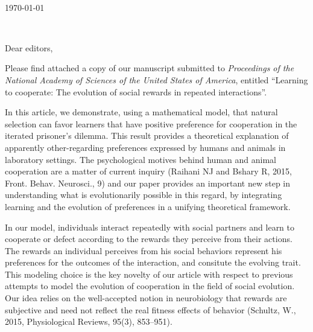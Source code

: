 \documentclass[11pt,letterpaper]{letter} %
\def\opening#1{\thispagestyle{empty}
{\centering\fromaddress \vspace{0.6in} \\ %
\hspace*{\longindentation}\today\hspace*{\fill}\par} %
{\raggedright \toname \\ \toaddress \par} %
\vspace{0.4in} %
\noindent #1 %
}
\begin{document}

\begin{letter}
{
}


\opening{Dear editors,}


Please find attached a copy of our manuscript submitted to \emph{Proceedings of the National Academy of Sciences of the United States of America}, entitled ``Learning to cooperate: The evolution of social rewards in repeated interactions''.


In this article, we demonstrate, using a mathematical model, that natural selection can favor learners that have positive preference for cooperation in the iterated prisoner's dilemma. This result provides a theoretical explanation of apparently other-regarding preferences expressed by humans and animals in laboratory settings. The psychological motives behind human and animal cooperation are a matter of current inquiry (Raihani NJ and Bshary R, 2015, Front. Behav. Neurosci., 9) and our paper provides an important new step in understanding what is evolutionarily possible in this regard, by integrating learning and the evolution of preferences in a unifying theoretical framework.

In our model, individuals interact repeatedly with social partners and learn to cooperate or defect according to the rewards they perceive from their actions. The rewards an individual perceives from his social behaviors represent his preferences for the outcomes of the interaction, and consitute the evolving trait. This modeling choice is the key novelty of our article with respect to previous attempts to model the evolution of cooperation in the field of social evolution. Our idea relies on the well-accepted notion in neurobiology that rewards are subjective and need not reflect the real fitness effects of behavior (Schultz, W., 2015, Physiological Reviews, 95(3), 853--951).



\end{letter}
\end{document}
